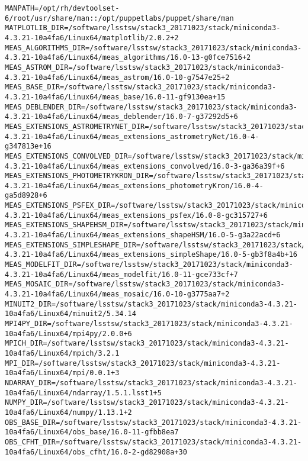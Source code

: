 \begin{verbatim}
MANPATH=/opt/rh/devtoolset-6/root/usr/share/man::/opt/puppetlabs/puppet/share/man
MATPLOTLIB_DIR=/software/lsstsw/stack3_20171023/stack/miniconda3-4.3.21-10a4fa6/Linux64/matplotlib/2.0.2+2
MEAS_ALGORITHMS_DIR=/software/lsstsw/stack3_20171023/stack/miniconda3-4.3.21-10a4fa6/Linux64/meas_algorithms/16.0-13-g0fce7516+2
MEAS_ASTROM_DIR=/software/lsstsw/stack3_20171023/stack/miniconda3-4.3.21-10a4fa6/Linux64/meas_astrom/16.0-10-g7547e25+2
MEAS_BASE_DIR=/software/lsstsw/stack3_20171023/stack/miniconda3-4.3.21-10a4fa6/Linux64/meas_base/16.0-11-gf9130ea+15
MEAS_DEBLENDER_DIR=/software/lsstsw/stack3_20171023/stack/miniconda3-4.3.21-10a4fa6/Linux64/meas_deblender/16.0-7-g37292d5+6
MEAS_EXTENSIONS_ASTROMETRYNET_DIR=/software/lsstsw/stack3_20171023/stack/miniconda3-4.3.21-10a4fa6/Linux64/meas_extensions_astrometryNet/16.0-4-g347813e+16
MEAS_EXTENSIONS_CONVOLVED_DIR=/software/lsstsw/stack3_20171023/stack/miniconda3-4.3.21-10a4fa6/Linux64/meas_extensions_convolved/16.0-3-ga36a39f+6
MEAS_EXTENSIONS_PHOTOMETRYKRON_DIR=/software/lsstsw/stack3_20171023/stack/miniconda3-4.3.21-10a4fa6/Linux64/meas_extensions_photometryKron/16.0-4-ga5d8928+6
MEAS_EXTENSIONS_PSFEX_DIR=/software/lsstsw/stack3_20171023/stack/miniconda3-4.3.21-10a4fa6/Linux64/meas_extensions_psfex/16.0-8-gc315727+6
MEAS_EXTENSIONS_SHAPEHSM_DIR=/software/lsstsw/stack3_20171023/stack/miniconda3-4.3.21-10a4fa6/Linux64/meas_extensions_shapeHSM/16.0-5-g3a22acd+6
MEAS_EXTENSIONS_SIMPLESHAPE_DIR=/software/lsstsw/stack3_20171023/stack/miniconda3-4.3.21-10a4fa6/Linux64/meas_extensions_simpleShape/16.0-5-gb3f8a4b+16
MEAS_MODELFIT_DIR=/software/lsstsw/stack3_20171023/stack/miniconda3-4.3.21-10a4fa6/Linux64/meas_modelfit/16.0-11-gce733cf+7
MEAS_MOSAIC_DIR=/software/lsstsw/stack3_20171023/stack/miniconda3-4.3.21-10a4fa6/Linux64/meas_mosaic/16.0-10-g3775aa7+2
MINUIT2_DIR=/software/lsstsw/stack3_20171023/stack/miniconda3-4.3.21-10a4fa6/Linux64/minuit2/5.34.14
MPI4PY_DIR=/software/lsstsw/stack3_20171023/stack/miniconda3-4.3.21-10a4fa6/Linux64/mpi4py/2.0.0+6
MPICH_DIR=/software/lsstsw/stack3_20171023/stack/miniconda3-4.3.21-10a4fa6/Linux64/mpich/3.2.1
MPI_DIR=/software/lsstsw/stack3_20171023/stack/miniconda3-4.3.21-10a4fa6/Linux64/mpi/0.0.1+3
NDARRAY_DIR=/software/lsstsw/stack3_20171023/stack/miniconda3-4.3.21-10a4fa6/Linux64/ndarray/1.5.1.lsst1+5
NUMPY_DIR=/software/lsstsw/stack3_20171023/stack/miniconda3-4.3.21-10a4fa6/Linux64/numpy/1.13.1+2
OBS_BASE_DIR=/software/lsstsw/stack3_20171023/stack/miniconda3-4.3.21-10a4fa6/Linux64/obs_base/16.0-11-gfbb8ea7
OBS_CFHT_DIR=/software/lsstsw/stack3_20171023/stack/miniconda3-4.3.21-10a4fa6/Linux64/obs_cfht/16.0-2-gd82908a+30

\end{verbatim}

